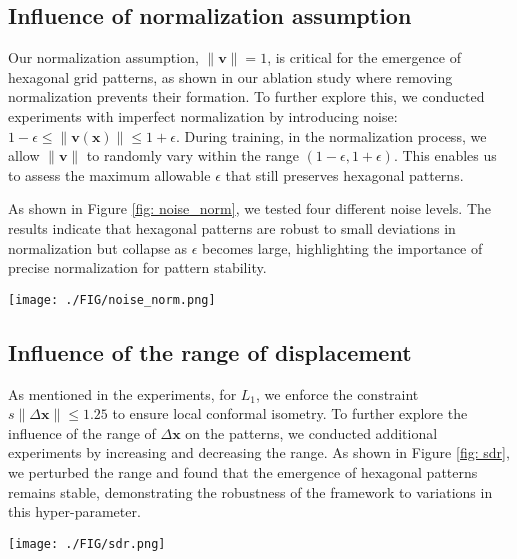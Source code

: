\documentclass{article}
\def\vv{{\bm{v}}}
\def\vx{{\bm{x}}}
\begin{document}
\subsection{Influence of normalization assumption}
\label{sec:noise_norm}
Our normalization assumption, $\|\vv\|=1$, is critical for the emergence of hexagonal grid patterns, as shown in our ablation study where removing normalization prevents their formation. To further explore this, we conducted experiments with imperfect normalization by introducing noise: $1-\epsilon\leq \|\vv(\vx)\|\leq 1+\epsilon$. During training, in the normalization process, we allow $\|\vv\|$ to randomly vary within the range $(1-\epsilon, 1+\epsilon)$.  This enables us to assess the maximum allowable $\epsilon$ that still preserves hexagonal patterns. 

As shown in Figure \ref{fig: noise_norm}, we tested four different noise levels. The results indicate that hexagonal patterns are robust to small deviations in normalization but collapse as $\epsilon$ becomes large, highlighting the importance of precise normalization for pattern stability.

\begin{figure*}[ht]
\centering
  \texttt{[image: ./FIG/noise\_norm.png]} \\
  \caption{\small Imperfect normalization with different noise levels. }
  \label{fig: noise_norm}
\end{figure*}

\subsection{Influence of the range of displacement}

As mentioned in the experiments, for $L_1$, we enforce the constraint $s\|\Delta\vx\|\leq 1.25$ to ensure local conformal isometry. To further explore the influence of the range of $\Delta\vx$ on the patterns, we conducted additional experiments by increasing and decreasing the range. As shown in Figure \ref{fig: sdr}, we perturbed the range and found that the emergence of hexagonal patterns remains stable, demonstrating the robustness of the framework to variations in this hyper-parameter.

\begin{figure*}[ht]
\centering
  \texttt{[image: ./FIG/sdr.png]} \\
  \caption{\small Varying the range of $\|\Delta\vx\|$ in conformal training. }
  \label{fig: sdr}
\end{figure*}
\end{document}
